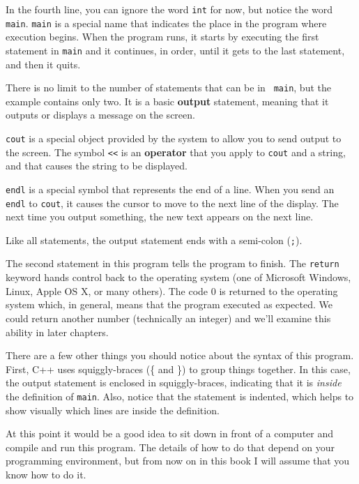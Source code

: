 In the fourth line, you can ignore the word {\tt int}
for now, but notice the word {\tt main}.  {\tt main} is a
special name that indicates the place in the program where execution
begins.  When the program runs, it starts by executing the first
statement in {\tt main} and it continues, in order, until it gets
to the last statement, and then it quits.


There is no limit to the number of statements that can be in {\tt
main}, but the example contains only two.  It is a basic {\bf
output} statement, meaning that it outputs or displays a message on
the screen.  

{\tt cout} is a special object provided by the system to allow
you to send output to the screen.  The symbol {\tt <<} is an
{\bf operator} that you apply to {\tt cout} and a string, and that
causes the string to be displayed.


{\tt endl} is a special symbol that represents the end of a
line.  When you send an {\tt endl} to {\tt cout}, it causes the
cursor to move to the next line of the display.
The next time you output something, the new text appears
on the next line.

Like all statements, the output statement ends with a
semi-colon ({\tt ;}).

The second statement in this program tells the program to finish.  The {\tt return} keyword hands control back to the operating system (one of Microsoft Windows, Linux, Apple OS X, or many others).  The code $0$ is returned to the operating system which, in general, means that the program executed as expected.  We could return another number (technically an integer) and we'll examine this ability in later chapters.

There are a few other things you should notice about the syntax of
this program.  First, C++ uses squiggly-braces (\{ and
\}) to group things together.  In this case, the output statement
is enclosed in squiggly-braces, indicating that it is {\em inside} the
definition of {\tt main}.  Also, notice that the statement is
indented, which helps to show visually which lines are inside the
definition.

At this point it would be a good idea to sit down in front of
a computer and compile and run this program.  The details of how
to do that depend on your programming environment, but from now
on in this book I will assume that you know how to do it.

